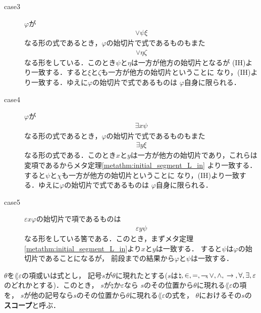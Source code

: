 \begin{metaprf}
\begin{description}
\begin{description}
					\item[case3] $\varphi$が
						\begin{align}
							\vee \psi \xi
						\end{align}
						なる形の式であるとき，$\varphi$の始切片で式であるものもまた
						\begin{align}
							\vee \eta \zeta
						\end{align}
						なる形をしている．このとき$\psi$と$\eta$は一方が他方の始切片となるが
						(IH)より一致する．すると$\xi$と$\zeta$も一方が他方の始切片ということに
						なり，(IH)より一致する．ゆえに$\varphi$の始切片で式であるものは
						$\varphi$自身に限られる．
						
					\item[case4] $\varphi$が
						\begin{align}
							\exists x \psi
						\end{align}
						なる形の式であるとき，$\varphi$の始切片で式であるものもまた
						\begin{align}
							\exists y \xi
						\end{align}
						なる形の式である．このとき$x$と$y$は一方が他方の始切片であり，これらは
						変項であるからメタ定理\ref{metathm:initial_segment_L_in}
						より一致する．すると$\psi$と$\chi$も一方が他方の始切片ということに
						なり，(IH)より一致する．ゆえに$\varphi$の始切片で式であるものは
						$\varphi$自身に限られる．
						
					\item[case5] $\varepsilon x \varphi$の始切片で項であるものは
						\begin{align}
							\varepsilon y \psi
						\end{align}
						なる形をしている筈である．このとき，まずメタ定理
						\ref{metathm:initial_segment_L_in}より$x$と$y$は一致する．
						すると$\psi$は$\varphi$の始切片であることになるが，
						前段までの結果から$\varphi$と$\psi$は一致する．
						\QED
				\end{description}
		\end{description}
	\end{metaprf}
	
	\begin{screen}
		\begin{metadfn}
		\label{metadfn:L_epsilon_scope}
			$\theta$を$\lang{\varepsilon}$の項或いは式とし，
			記号$s$が$\theta$に現れたとする($s$は$\natural,\in,=,\rightharpoondown\hspace{-0.25em},\vee,\wedge,
			\hspace{0.25em}\rightarrow\hspace{0.25em},\forall,\exists,\varepsilon$のどれかとする)．このとき，
			$s$が$\natural$か$\varepsilon$なら
			$s$のその位置から$\theta$に現れる$\lang{\varepsilon}$の項を，
			$s$が他の記号なら$s$のその位置から$\theta$に現れる$\lang{\varepsilon}$の式を，
			$\theta$におけるその$s$の{\bf スコープ}と呼ぶ．
		\end{metadfn}
	\end{screen}
	
